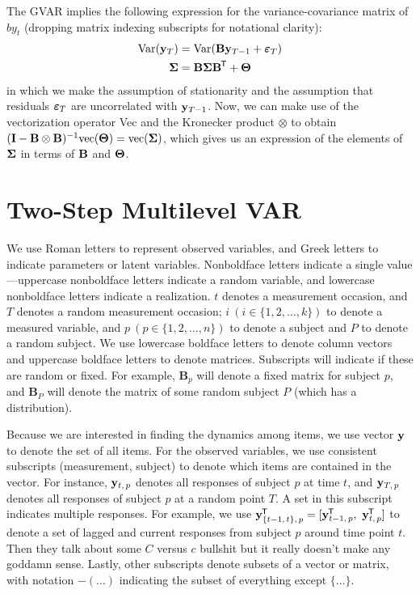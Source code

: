 The GVAR implies the following expression for the variance-covariance matrix of $by_t$ (dropping matrix indexing subscripts for notational clarity):
\begin{equation}
    \begin{split}
        \text{Var}(\mathbf{y}_T) &= \text{Var}(\mathbf{B}\mathbf{y}_{T-1} + \bm{\varepsilon}_T) \\
        \bm{\Sigma} &= \mathbf{B}\bm{\Sigma}\mathbf{B}^{\mkern-1.5mu\mathsf{T}} + \bm{\Theta}
    \end{split}
\end{equation}
in which we make the assumption of stationarity and the assumption that residuals $\bm{\varepsilon}_T$ are uncorrelated with $\mathbf{y}_{T-1}$. Now, we can make use of the vectorization operator Vec and the Kronecker product $\otimes$ to obtain $(\mathbf{I} - \mathbf{B}\otimes\mathbf{B})^{-1} \text{vec}({\bm{\Theta}}) = \text{vec}({\bm{\Sigma}})$, which gives us an expression of the elements of $\bm{\Sigma}$ in terms of $\mathbf{B}$ and $\bm{\Theta}$.
 
\section{Two-Step Multilevel VAR}
We use Roman letters to represent observed variables, and Greek letters to indicate parameters or latent variables. Nonboldface letters indicate a single value---uppercase nonboldface letters indicate a random variable, and lowercase nonboldface letters indicate a realization. $t$ denotes a measurement occasion, and $T$ denotes a random measurement occasion; $i\ (i \in \{1, 2, \ldots, k\})$ to denote a measured variable, and $p\ (p \in \{1,2,\ldots,n\})$ to denote a subject and $P$ to denote a random subject. We use lowercase boldface letters to denote column vectors and uppercase boldface letters to denote matrices. Subscripts will indicate if these are random or fixed. For example, $\bm{B}_p$ will denote a fixed matrix for subject $p$, and $\bm{B}_P$ will denote the matrix of some random subject $P$ (which has a distribution). 

Because we are interested in finding the dynamics among items, we use vector $\mathbf{y}$ to denote the set of all items. For the observed variables, we use consistent subscripts (measurement, subject) to denote which items are contained in the vector. For instance, $\mathbf{y}_{t,\,p}$ denotes all responses of subject $p$ at time $t$, and $\mathbf{y}_{T,\,p}$ denotes all responses of subject $p$ at a random point $T$. A set in this subscript indicates multiple responses. For example, we use $\mathbf{y}_{\{t - 1,\,t\},\,p}^{\mkern-1.5mu\mathsf{T}} = \lbrack \mathbf{y}_{t-1,\,p}^{\mkern-1.5mu\mathsf{T}},\ \mathbf{y}_{t,\,p}^{\mkern-1.5mu\mathsf{T}} \rbrack$ to denote a set of lagged and current responses from subject $p$ around time point $t$. Then they talk about some $C$ versus $c$ bullshit but it really doesn't make any goddamn sense. Lastly, other subscripts denote subsets of a vector or matrix, with notation $-(\ldots)$ indicating the subset of everything except $\{\ldots\}$.

